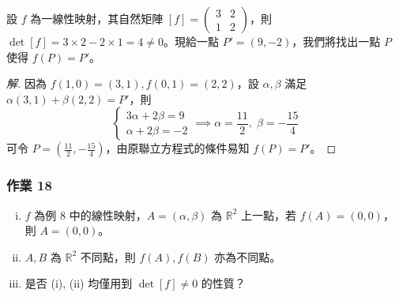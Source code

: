 \begin{example}[例 8]
設 $f$ 為一線性映射，其自然矩陣 $[f] = \begin{pmatrix} 3 & 2 \\ 1 & 2 \end{pmatrix}$，則 $\det[f] = 3 \times 2 - 2 \times 1 = 4 \neq 0$。現給一點 $P' = (9, -2)$，我們將找出一點 $P$ 使得 $f(P) = P'$。
\end{example}

\begin{proof}[解]
因為 $f(1, 0) = (3, 1), f(0, 1) = (2, 2)$，設 $\alpha, \beta$ 滿足 $\alpha(3, 1) + \beta(2, 2) = P'$，則
\[ \begin{cases} 3\alpha + 2\beta = 9 \\ \alpha + 2\beta = -2 \end{cases} \implies \alpha = \frac{11}{2}, \; \beta = -\frac{15}{4} \]
可令 $P = (\frac{11}{2}, -\frac{15}{4})$，由原聯立方程式的條件易知 $f(P) = P'$。
\end{proof}

\subsubsection*{作業 18}
\begin{enumerate}[(i)]
  \item $f$ 為例 8 中的線性映射，$A = (\alpha, \beta)$ 為 $\mathbb{R}^2$ 上一點，若 $f(A) = (0, 0)$，則 $A = (0, 0)$。
  \item $A, B$ 為 $\mathbb{R}^2$ 不同點，則 $f(A), f(B)$ 亦為不同點。
  \item 是否 (i), (ii) 均僅用到 $\det[f] \neq 0$ 的性質？
\end{enumerate}

